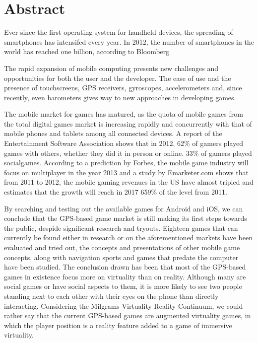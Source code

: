 \section{Abstract}

Ever since the first operating system for handheld devices, the spreading of
smartphones has intensifed every year. In 2012, the number of smartphones in the
world has reached one billion, according to Bloomberg\cite{bloomberg} \newline

The rapid expansion of mobile computing presents new challenges and
opportunities for both the user and the developer. The ease of use and the
presence of touchscreens, GPS receivers, gyroscopes, accelerometers and, since
recently, even barometers gives way to new approaches in developing
games.\newline

The mobile market for games has matured, as the quota of mobile games from the
total digital games market is increasing rapidly and concurrently with that of
mobile phones and tablets among all connected devices. A report of the
Entertainment Software Association shows that in 2012, 62\% of gamers played
games with others, whether they did it in person or online. 33\% of gamers
played socialgames\cite{esa}. According to a prediction by Forbes, the mobile
game industry will focus on multiplayer in the year 2013\cite{forbes}
and a study by Emarketer.com shows that from 2011 to 2012, the mobile
gaming revenues in the US have almost tripled and estimates that the
growth will reach in 2017 659\% of the level from 2011\cite{emarketer}.\newline

By searching and testing out the available games for Android and iOS, we can
conclude that the GPS-based game market is still making its first steps towards
the public, despide significant research and tryouts. Eighteen games that can
currently be found either in research or on the aforementioned markets have been
evaluated and tried out, the concepts and presentations of other mobile game
concepts, along with navigation sports and games that predate the computer have
been studied. The conclusion drawn has been that most of the GPS-based games in
existence focus more on virtuality than on reality. Although many are social
games or have social aspects to them, it is more likely to see two people
standing next to each other with their eyes on the phone than directly
interacting. Considering the Milgrams Virtuality-Reality Continuum, we could
rather say that the current GPS-based games are augmented virtuality games, in
which the player position is a reality feature added to a game of immersive
virtuality.\newline

